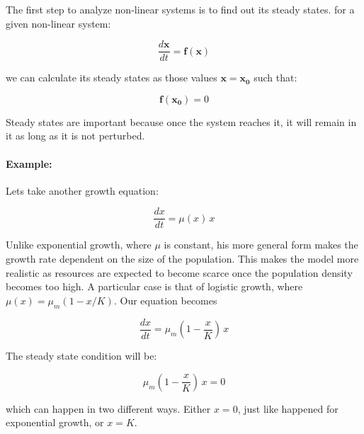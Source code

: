 \documentclass[12pt]{article}
\begin{document}
The first step to analyze non-linear systems is to find out its steady states. for a given non-linear system:

\begin{equation}
	\label{odegeneral}
	\frac{d\mathbf{x}}{dt} = \mathbf{f}(\mathbf{x})
\end{equation}

we can calculate its steady states as those values $\mathbf{x}= \mathbf{x_0}$ such that:

\begin{equation}
	\label{stst}
	\mathbf{f}(\mathbf{x_0}) = 0
\end{equation}

Steady states are important because once the system reaches it, it will remain in it as long as it is not perturbed.

\paragraph{Example:} Lets take another growth equation:

\begin{equation}
	\label{odgrowth}
	\frac{dx}{dt} = \mu(x) \, x 
\end{equation}

Unlike exponential growth, where $\mu$ is constant, his more general form makes the growth rate dependent on the size of the population. This makes the model more realistic as resources are expected to become scarce once the population density becomes too high. A particular case is that of logistic growth, where $\mu(x) = \mu_{m} (1 - x / K)$. Our equation becomes

\begin{equation}
	\label{logistic}
	\frac{dx}{dt} = \mu_{m} \left(1 - \frac{x}{K} \right) \, x 
\end{equation}

The steady state condition will be:

\begin{equation}
 \mu_{m} \left(1 - \frac{x}{K} \right) \, x = 0
\end{equation}

which can happen in two different ways. Either $x=0$, just like happened for exponential growth, or $x=K$.
\end{document}

